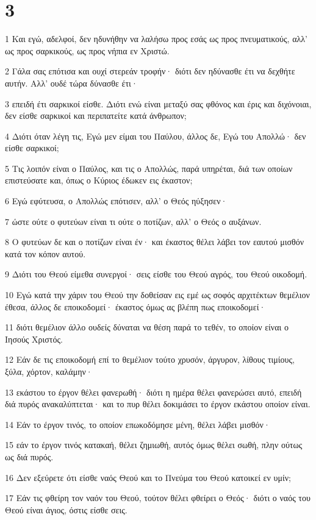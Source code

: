 \chapter{3}

\par 1 Και εγώ, αδελφοί, δεν ηδυνήθην να λαλήσω προς εσάς ως προς πνευματικούς, αλλ' ως προς σαρκικούς, ως προς νήπια εν Χριστώ.
\par 2 Γάλα σας επότισα και ουχί στερεάν τροφήν· διότι δεν ηδύνασθε έτι να δεχθήτε αυτήν. Αλλ' ουδέ τώρα δύνασθε έτι·
\par 3 επειδή έτι σαρκικοί είσθε. Διότι ενώ είναι μεταξύ σας φθόνος και έρις και διχόνοιαι, δεν είσθε σαρκικοί και περιπατείτε κατά άνθρωπον;
\par 4 Διότι όταν λέγη τις, Εγώ μεν είμαι του Παύλου, άλλος δε, Εγώ του Απολλώ· δεν είσθε σαρκικοί;
\par 5 Τις λοιπόν είναι ο Παύλος, και τις ο Απολλώς, παρά υπηρέται, διά των οποίων επιστεύσατε και, όπως ο Κύριος έδωκεν εις έκαστον;
\par 6 Εγώ εφύτευσα, ο Απολλώς επότισεν, αλλ' ο Θεός ηύξησεν·
\par 7 ώστε ούτε ο φυτεύων είναι τι ούτε ο ποτίζων, αλλ' ο Θεός ο αυξάνων.
\par 8 Ο φυτεύων δε και ο ποτίζων είναι έν· και έκαστος θέλει λάβει τον εαυτού μισθόν κατά τον κόπον αυτού.
\par 9 Διότι του Θεού είμεθα συνεργοί· σεις είσθε του Θεού αγρός, του Θεού οικοδομή.
\par 10 Εγώ κατά την χάριν του Θεού την δοθείσαν εις εμέ ως σοφός αρχιτέκτων θεμέλιον έθεσα, άλλος δε εποικοδομεί· έκαστος όμως ας βλέπη πως εποικοδομεί·
\par 11 διότι θεμέλιον άλλο ουδείς δύναται να θέση παρά το τεθέν, το οποίον είναι ο Ιησούς Χριστός.
\par 12 Εάν δε τις εποικοδομή επί το θεμέλιον τούτο χρυσόν, άργυρον, λίθους τιμίους, ξύλα, χόρτον, καλάμην·
\par 13 εκάστου το έργον θέλει φανερωθή· διότι η ημέρα θέλει φανερώσει αυτό, επειδή διά πυρός ανακαλύπτεται· και το πυρ θέλει δοκιμάσει το έργον εκάστου οποίον είναι.
\par 14 Εάν το έργον τινός, το οποίον επωκοδόμησε μένη, θέλει λάβει μισθόν·
\par 15 εάν το έργον τινός κατακαή, θέλει ζημιωθή, αυτός όμως θέλει σωθή, πλην ούτως ως διά πυρός.
\par 16 Δεν εξεύρετε ότι είσθε ναός Θεού και το Πνεύμα του Θεού κατοικεί εν υμίν;
\par 17 Εάν τις φθείρη τον ναόν του Θεού, τούτον θέλει φθείρει ο Θεός· διότι ο ναός του Θεού είναι άγιος, όστις είσθε σεις.
